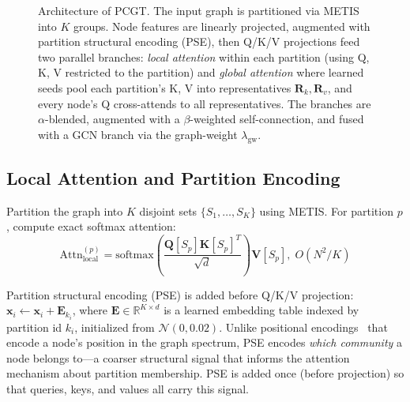 \documentclass[manuscript, screen, review, anonymous]{acmart}
\begin{document}
\begin{figure}[t]
{
}%
\caption{Architecture of PCGT\@. The input graph is partitioned via METIS into $K$ groups. Node features are linearly projected, augmented with partition structural encoding (PSE), then Q/K/V projections feed two parallel branches: \emph{local attention} within each partition (using Q, K, V restricted to the partition) and \emph{global attention} where learned seeds pool each partition's K, V into representatives $\mathbf{R}_k, \mathbf{R}_v$, and every node's Q cross-attends to all representatives. The branches are $\alpha$-blended, augmented with a $\beta$-weighted self-connection, and fused with a GCN branch via the graph-weight $\lambda_{\text{gw}}$.}
\label{fig:architecture}
\end{figure}

\subsection{Local Attention and Partition Encoding}

Partition the graph into $K$ disjoint sets $\{S_1, \ldots, S_K\}$ using METIS. For partition $p$, compute exact softmax attention:
\begin{equation}
\text{Attn}_{\text{local}}^{(p)} = \text{softmax}\!\left( \frac{\mathbf{Q}[S_p] \mathbf{K}[S_p]^T}{\sqrt{d}} \right) \mathbf{V}[S_p],\; O(N^2\!/K)
\end{equation}

Partition structural encoding (PSE) is added before Q/K/V projection: $\mathbf{x}_i \leftarrow \mathbf{x}_i + \mathbf{E}_{k_i}$, where $\mathbf{E} \in \mathbb{R}^{K \times d}$ is a learned embedding table indexed by partition id $k_i$, initialized from $\mathcal{N}(0, 0.02)$. Unlike positional encodings~\cite{dwivedi2022lspe} that encode a node's position in the graph spectrum, PSE encodes \emph{which community} a node belongs to---a coarser structural signal that informs the attention mechanism about partition membership. PSE is added once (before projection) so that queries, keys, and values all carry this signal.
\end{document}
